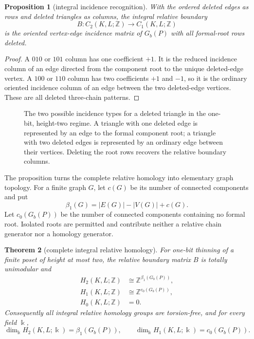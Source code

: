 \documentclass[11pt]{article}
\newtheorem{theorem}{Theorem}[section]
\newtheorem{proposition}[theorem]{Proposition}
\theoremstyle{definition}
\theoremstyle{remark}
\newcommand{\Z}{\mathbb Z}
\begin{document}
\begin{proposition}[integral incidence recognition]\label{prop:integral-incidence}
With the ordered deleted edges as rows and deleted triangles as columns, the integral
relative boundary
\[
  B:C_2(K,L;\Z)\longrightarrow C_1(K,L;\Z)
\]
is the oriented vertex-edge incidence matrix of $G_b(P)$ with all formal-root rows
deleted.
\end{proposition}

\begin{proof}
A $010$ or $101$ column has one coefficient $+1$.  It is the reduced incidence column
of an edge directed from the component root to the unique deleted-edge vertex.  A
$100$ or $110$ column has two coefficients $+1$ and $-1$, so it is the ordinary
oriented incidence column of an edge between the two deleted-edge vertices.  These
are all deleted three-chain patterns.
\end{proof}

\begin{figure}[t]
\centering
{}
\caption{The two possible incidence types for a deleted triangle in the one-bit,
height-two regime.  A triangle with one deleted edge is represented by an edge to the
formal component root; a triangle with two deleted edges is represented by an ordinary
edge between their vertices.  Deleting the root rows recovers the relative boundary
columns.}
\label{fig:incidence-types}
\end{figure}

The proposition turns the complete relative homology into elementary graph topology.
For a finite graph $G$, let $c(G)$ be its number of connected components and put
\[
  \beta_1(G)=|E(G)|-|V(G)|+c(G).
\]
Let $c_0(G_b(P))$ be the number of connected components containing no formal root.
Isolated roots are permitted and contribute neither a relative chain generator nor a
homology generator.

\begin{theorem}[complete integral relative homology]\label{thm:integral-homology}
For one-bit thinning of a finite poset of height at most two, the relative boundary
matrix $B$ is totally unimodular and
\begin{align}
  H_2(K,L;\Z)&\cong\Z^{\beta_1(G_b(P))},\label{eq:h2formula}\\
  H_1(K,L;\Z)&\cong\Z^{c_0(G_b(P))},\label{eq:h1formula}\\
  H_0(K,L;\Z)&=0.\label{eq:h0formula}
\end{align}
Consequently all integral relative homology groups are torsion-free, and for every
field $\Bbbk$,
\[
  \dim_{\Bbbk}H_2(K,L;\Bbbk)=\beta_1(G_b(P)),\qquad
  \dim_{\Bbbk}H_1(K,L;\Bbbk)=c_0(G_b(P)).
\]
\end{theorem}
\end{document}
